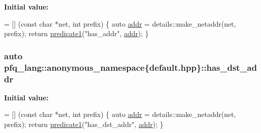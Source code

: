 {\bfseries Initial value\+:}
\begin{DoxyCode}
= [] (\textcolor{keyword}{const} \textcolor{keywordtype}{char} *net, \textcolor{keywordtype}{int} prefix)
        \{
            \textcolor{keyword}{auto} \hyperlink{namespacepfq__lang_1_1anonymous__namespace_02default_8hpp_03_aafce8334d1be83bff9a2115439c8c453}{addr} = details::make\_netaddr(net, prefix);
            \textcolor{keywordflow}{return} \hyperlink{namespacepfq__lang_ae23a03cee94b5ddfde4a8d2e5c521f0e}{predicate1}(\textcolor{stringliteral}{"has\_addr"}, \hyperlink{namespacepfq__lang_1_1anonymous__namespace_02default_8hpp_03_aafce8334d1be83bff9a2115439c8c453}{addr});
        \}
\end{DoxyCode}
\hypertarget{namespacepfq__lang_1_1anonymous__namespace_02default_8hpp_03_af223a0513ceffa69c0b8535a7cca12da}{
\subsubsection[{has\+\_\+dst\+\_\+addr}]{\setlength{\rightskip}{0pt plus 5cm}auto pfq\+\_\+lang\+::anonymous\+\_\+namespace\{default.\+hpp\}\+::has\+\_\+dst\+\_\+addr}}\label{namespacepfq__lang_1_1anonymous__namespace_02default_8hpp_03_af223a0513ceffa69c0b8535a7cca12da}
{\bfseries Initial value\+:}
\begin{DoxyCode}
= [] (\textcolor{keyword}{const} \textcolor{keywordtype}{char} *net, \textcolor{keywordtype}{int} prefix)
        \{
            \textcolor{keyword}{auto} \hyperlink{namespacepfq__lang_1_1anonymous__namespace_02default_8hpp_03_aafce8334d1be83bff9a2115439c8c453}{addr} = details::make\_netaddr(net, prefix);
            \textcolor{keywordflow}{return} \hyperlink{namespacepfq__lang_ae23a03cee94b5ddfde4a8d2e5c521f0e}{predicate1}(\textcolor{stringliteral}{"has\_dst\_addr"}, \hyperlink{namespacepfq__lang_1_1anonymous__namespace_02default_8hpp_03_aafce8334d1be83bff9a2115439c8c453}{addr});
        \}
\end{DoxyCode}
